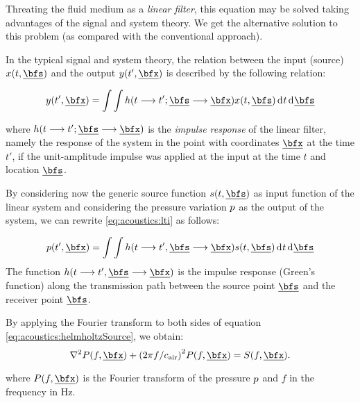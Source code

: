 Threating the fluid medium as a \textit{linear filter}, this equation may be solved taking advantages of the signal and system theory.
We get the alternative solution to this problem (as compared with the conventional approach).

In the typical signal and system theory, the relation between the input (source) $x(t, \positionSource)$ and
the output $y(t', \positionMicrophone)$ is described by the following relation:

\begin{equation}
    \label{eq:acoustics:lti}
    y(t', \positionMicrophone) =
    \int \int
        h(t \kto  t' ; \positionSource \kto \positionMicrophone)
        x(t, \positionSource)
        \kdiff t  \kdiff \positionSource
\end{equation}

where $h(t \kto  t' ; \positionSource \kto \positionMicrophone)$ is the \textit{impulse response} of the linear filter, namely the response of the system
in the point with coordinates $\positionMicrophone$ at the time $t'$, if the unit-amplitude impulse was applied at the input at the time $t$ and location $\positionSource$.

By considering now the generic source function $s(t, \positionSource)$ as input function of the linear system and considering the pressure variation $p$ as the output of the system,
we can rewrite \cref{eq:acoustics:lti} as follows:

\begin{equation}
    \label{eq:acoustics:lti:pressure}
    p(t', \positionMicrophone) =
    \int \int
        h(t \kto  t', \positionSource \kto \positionMicrophone)
        s(t, \positionSource)
        \kdiff t  \kdiff \positionSource
\end{equation}
The function $h(t \kto  t', \positionSource \kto \positionMicrophone)$ is the impulse response (Green's function)
along the transmission path between the source point $\positionSource$ and the receiver point $\positionSource$.

By applying the Fourier transform to both sides of equation \cref{eq:acoustics:helmholtzSource}, we obtain:
\begin{equation}
    \label{eq:acoustics:helmholtzSource}
    \knabla^2 P(f, \positionMicrophone) + \kparen{2 \pi f / \cair}^2 P(f, \positionMicrophone) = S(f, \positionMicrophone).
\end{equation}

where  $P(f, \positionMicrophone)$ is the Fourier transform of the pressure $p$ and $f$ in the frequency in $\si{\hertz}$.

